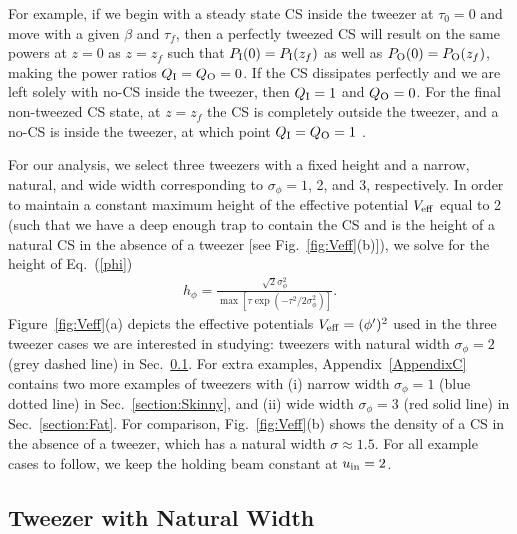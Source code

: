 \documentclass[aps,floatfix,showpacs,preprintnumbers,twocolumn,nofootinbib]{revtex4}
\begin{document}
For example, if we begin with a steady state CS inside the tweezer at $\tau_0=0$ and move with a given $\beta$ and $\tau_f$, then a perfectly tweezed CS will result on the same powers at $z=0$ as $z = z_f$ such that $P_{\rm I}(0) =  P_{\rm I}(z_f)$ as well as $P_{\rm O}(0) = P_{\rm O}(z_f)$, making the power ratios $Q_{\rm I} = Q_{\rm O} = 0$.   If the CS dissipates perfectly and we are left solely with no-CS inside the tweezer, then $Q_{\rm I} = 1$ and  $Q_{\rm O} = 0$.  For the final non-tweezed CS state, at $z=z_f$ the CS is completely outside the tweezer, and a no-CS is inside the tweezer, at which point $Q_{\rm I} = Q_{\rm O} = 1$ .   

For our analysis, we select three tweezers with a fixed height and a narrow, natural, and wide width corresponding to $\sigma_\phi = 1$, 2, and 3, respectively.  In order to maintain a constant maximum height of the effective potential $V_{\rm eff}$ equal to 2 (such that we have a deep enough trap to contain the CS and is the height of a natural CS in the absence of a tweezer [see Fig.~\ref{fig:Veff}(b)]), we solve for the height of Eq.~(\ref{phi}) 
\begin{align}
h_\phi = \frac{\sqrt{2} \sigma_{\phi}^2}{\max [\tau \exp(-\tau^2/2\sigma_{\phi}^2)]}.
\label{height}
\end{align}
Figure~\ref{fig:Veff}(a) depicts the effective potentials $V_{\rm eff} = (\phi')^2$ used in the three tweezer cases we are interested in studying: tweezers with natural width $\sigma_\phi = 2$ (grey dashed line) in Sec.~\ref{section:Regular}.  For extra examples, Appendix~\ref{AppendixC} contains two more examples of tweezers with (i) narrow width $\sigma_\phi = 1$ (blue dotted line) in Sec.~\ref{section:Skinny}, and (ii) wide width $\sigma_\phi = 3$ (red solid line) in Sec.~\ref{section:Fat}.  For comparison, Fig.~\ref{fig:Veff}(b) shows the density of a CS in the absence of a tweezer, which has a natural width $\sigma \approx 1.5$.  For all example cases to follow, we keep the holding beam constant at $u_{\rm in} = 2$.


\subsection{Tweezer with Natural Width}
 \label{section:Regular}
 
\end{document}
